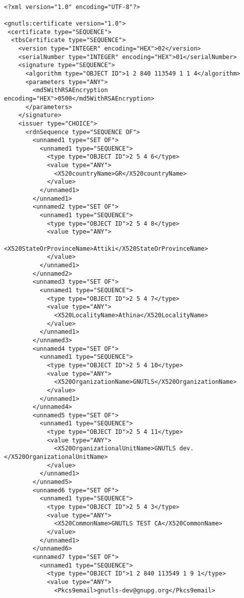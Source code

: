 \begin{verbatim}

<?xml version="1.0" encoding="UTF-8"?>

<gnutls:certificate version="1.0">
 <certificate type="SEQUENCE">
  <tbsCertificate type="SEQUENCE">
    <version type="INTEGER" encoding="HEX">02</version>
    <serialNumber type="INTEGER" encoding="HEX">01</serialNumber>
    <signature type="SEQUENCE">
      <algorithm type="OBJECT ID">1 2 840 113549 1 1 4</algorithm>
      <parameters type="ANY">
        <md5WithRSAEncryption encoding="HEX">0500</md5WithRSAEncryption>
      </parameters>
    </signature>
    <issuer type="CHOICE">
      <rdnSequence type="SEQUENCE OF">
        <unnamed1 type="SET OF">
          <unnamed1 type="SEQUENCE">
            <type type="OBJECT ID">2 5 4 6</type>
            <value type="ANY">
              <X520countryName>GR</X520countryName>
            </value>
          </unnamed1>
        </unnamed1>
        <unnamed2 type="SET OF">
          <unnamed1 type="SEQUENCE">
            <type type="OBJECT ID">2 5 4 8</type>
            <value type="ANY">
              <X520StateOrProvinceName>Attiki</X520StateOrProvinceName>
            </value>
          </unnamed1>
        </unnamed2>
        <unnamed3 type="SET OF">
          <unnamed1 type="SEQUENCE">
            <type type="OBJECT ID">2 5 4 7</type>
            <value type="ANY">
              <X520LocalityName>Athina</X520LocalityName>
            </value>
          </unnamed1>
        </unnamed3>
        <unnamed4 type="SET OF">
          <unnamed1 type="SEQUENCE">
            <type type="OBJECT ID">2 5 4 10</type>
            <value type="ANY">
              <X520OrganizationName>GNUTLS</X520OrganizationName>
            </value>
          </unnamed1>
        </unnamed4>
        <unnamed5 type="SET OF">
          <unnamed1 type="SEQUENCE">
            <type type="OBJECT ID">2 5 4 11</type>
            <value type="ANY">
              <X520OrganizationalUnitName>GNUTLS dev.</X520OrganizationalUnitName>
            </value>
          </unnamed1>
        </unnamed5>
        <unnamed6 type="SET OF">
          <unnamed1 type="SEQUENCE">
            <type type="OBJECT ID">2 5 4 3</type>
            <value type="ANY">
              <X520CommonName>GNUTLS TEST CA</X520CommonName>
            </value>
          </unnamed1>
        </unnamed6>
        <unnamed7 type="SET OF">
          <unnamed1 type="SEQUENCE">
            <type type="OBJECT ID">1 2 840 113549 1 9 1</type>
            <value type="ANY">
              <Pkcs9email>gnutls-dev@gnupg.org</Pkcs9email>

\end{verbatim}
